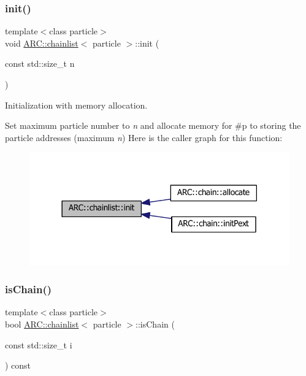 \subsubsection{\texorpdfstring{init()}{init()}}
{\footnotesize\ttfamily template$<$class particle$>$ \\
void \hyperlink{classARC_1_1chainlist}{A\+R\+C\+::chainlist}$<$ particle $>$\+::init (\begin{DoxyParamCaption}\item[{const std\+::size\+\_\+t}]{n }\end{DoxyParamCaption})\hspace{0.3cm}{\ttfamily [inline]}}



Initialization with memory allocation. 

Set maximum particle number to {\itshape n} and allocate memory for \#p to storing the particle addresses (maximum {\itshape n}) Here is the caller graph for this function\+:
\nopagebreak
\begin{figure}[H]
\begin{center}
\leavevmode
\includegraphics[width=318pt]{classARC_1_1chainlist_a84a2c65edf27bd25254e188ebf7d5dce_icgraph}
\end{center}
\end{figure}
\hypertarget{classARC_1_1chainlist_a192f6db3659e5329d137de18c8c4b029}{}\label{classARC_1_1chainlist_a192f6db3659e5329d137de18c8c4b029} 
\subsubsection{\texorpdfstring{is\+Chain()}{isChain()}}
{\footnotesize\ttfamily template$<$class particle$>$ \\
bool \hyperlink{classARC_1_1chainlist}{A\+R\+C\+::chainlist}$<$ particle $>$\+::is\+Chain (\begin{DoxyParamCaption}\item[{const std\+::size\+\_\+t}]{i }\end{DoxyParamCaption}) const\hspace{0.3cm}{\ttfamily [inline]}}




